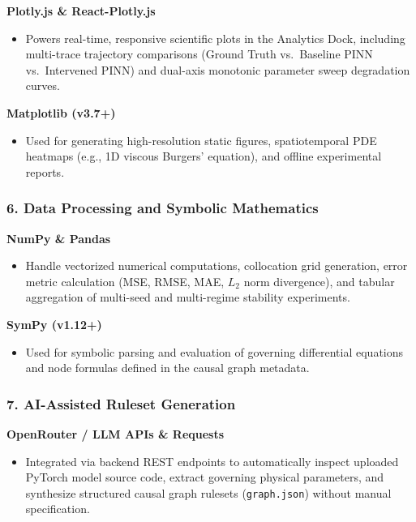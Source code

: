 \documentclass[12pt,singleside,a4paper]{article}
\begin{document}
\textbf{Plotly.js \& React-Plotly.js}
\begin{itemize}
    \item Powers real-time, responsive scientific plots in the Analytics Dock, including multi-trace trajectory comparisons (Ground Truth vs.\ Baseline PINN vs.\ Intervened PINN) and dual-axis monotonic parameter sweep degradation curves.
\end{itemize}

\textbf{Matplotlib (v3.7+)}
\begin{itemize}
    \item Used for generating high-resolution static figures, spatiotemporal PDE heatmaps (e.g., 1D viscous Burgers' equation), and offline experimental reports.
\end{itemize}

\subsubsection{6. Data Processing and Symbolic Mathematics}

\textbf{NumPy \& Pandas}
\begin{itemize}
    \item Handle vectorized numerical computations, collocation grid generation, error metric calculation (MSE, RMSE, MAE, $L_2$ norm divergence), and tabular aggregation of multi-seed and multi-regime stability experiments.
\end{itemize}

\textbf{SymPy (v1.12+)}
\begin{itemize}
    \item Used for symbolic parsing and evaluation of governing differential equations and node formulas defined in the causal graph metadata.
\end{itemize}

\subsubsection{7. AI-Assisted Ruleset Generation}

\textbf{OpenRouter / LLM APIs \& Requests}
\begin{itemize}
    \item Integrated via backend REST endpoints to automatically inspect uploaded PyTorch model source code, extract governing physical parameters, and synthesize structured causal graph rulesets (\texttt{graph.json}) without manual specification.
\end{itemize}
\end{document}
